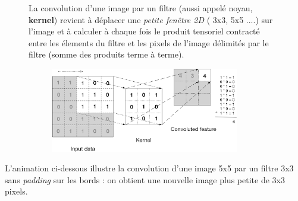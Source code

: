 \documentclass{article}
\begin{document}
\begin{figure}[H]
\begin{minipage}[c]{0.4\linewidth}

La convolution d'une image par un filtre (aussi appelé noyau, \textbf{kernel}) revient à déplacer
une \textit{petite fenêtre 2D} ( 3x3, 5x5 ....) sur l'image et à calculer à chaque fois le produit 
tensoriel contracté entre les élements du filtre et les pixels de l'image délimités par 
le filtre (somme des produits terme à terme).

\end{minipage} \hfill
\begin{minipage}[c]{0.6\linewidth}

\begin{figure}[H]
\centering
\includegraphics[width=0.9\textwidth]{img/grayscale.png}
\end{figure}


\end{minipage}
\end{figure}

L'animation ci-dessous illustre la convolution d'une image 5x5 par un filtre 3x3 sans \textit{padding} 
sur les bords : on obtient une nouvelle image plus petite de 3x3 pixels.

\newpage
\end{document}
